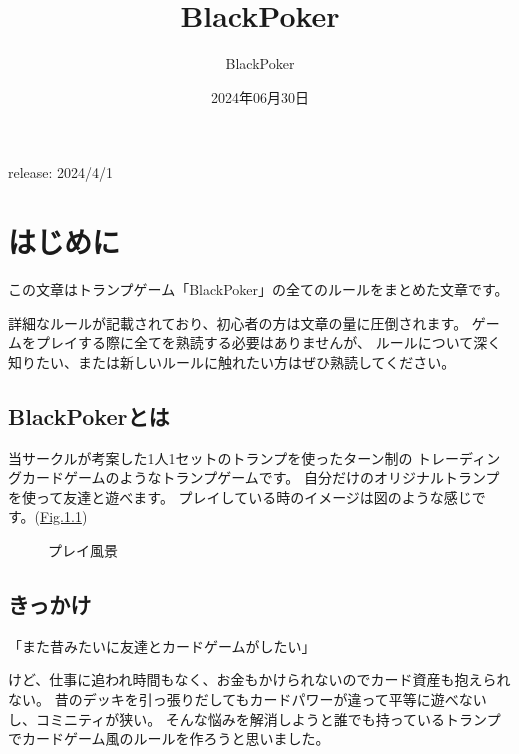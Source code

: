 \documentclass[letterpaper,10pt,dvipdfmx]{sphinxmanual}
\title{BlackPoker}
\date{2024年06月30日}
\author{BlackPoker}
\begin{document}
\pagestyle{empty}
\sphinxmaketitle
\pagestyle{plain}
\sphinxtableofcontents
\pagestyle{normal}
\label{\detokenize{index::doc}}


\sphinxAtStartPar
release: 2024/4/1

\sphinxstepscope


\chapter{はじめに}
\label{\detokenize{init/init:init-rst}}\label{\detokenize{init/init:id1}}\label{\detokenize{init/init::doc}}
\sphinxAtStartPar
この文章はトランプゲーム「BlackPoker」の全てのルールをまとめた文章です。

\sphinxAtStartPar
詳細なルールが記載されており、初心者の方は文章の量に圧倒されます。
ゲームをプレイする際に全てを熟読する必要はありませんが、
ルールについて深く知りたい、または新しいルールに触れたい方はぜひ熟読してください。


\section{BlackPokerとは}
\label{\detokenize{init/init:blackpoker}}
\sphinxAtStartPar
当サークルが考案した1人1セットのトランプを使ったターン制の
トレーディングカードゲームのようなトランプゲームです。
自分だけのオリジナルトランプを使って友達と遊べます。
プレイしている時のイメージは図のような感じです。(\hyperref[\detokenize{init/init:play-image}]{Fig.\@ \ref{\detokenize{init/init:play-image}}})

\begin{figure}[htbp]
\centering
\capstart

\noindent{}
\caption{プレイ風景}\label{\detokenize{init/init:id8}}\label{\detokenize{init/init:play-image}}\end{figure}


\section{きっかけ}
\label{\detokenize{init/init:id2}}
\begin{sphinxVerbatim}[commandchars=\\\{\}]
「また昔みたいに友達とカードゲームがしたい」
\end{sphinxVerbatim}

\sphinxAtStartPar
けど、仕事に追われ時間もなく、お金もかけられないのでカード資産も抱えられない。
昔のデッキを引っ張りだしてもカードパワーが違って平等に遊べないし、コミニティが狭い。
そんな悩みを解消しようと誰でも持っているトランプでカードゲーム風のルールを作ろうと思いました。
\end{document}

